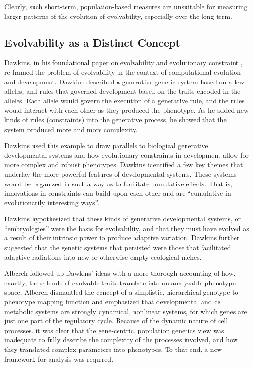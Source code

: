 \documentclass[PhD]{msu-thesis}
\begin{document}
Clearly, such short-term, population-based measures are unsuitable for measuring larger patterns of the evolution of evolvability, especially over the long term.

\subsection{Evolvability as a Distinct Concept}
Dawkins, in his foundational paper on evolvability and evolutionary constraint \cite{dawkins_13_2003}, re-framed the problem of evolvability in the context of computational evolution and development. Dawkins described a generative genetic system based on a few alleles, and rules that governed development based on the traits encoded in the alleles. Each allele would govern the execution of a generative rule, and the rules would interact with each other as they produced the phenotype. As he added new kinds of rules (constraints) into the generative process, he showed that the system produced more and more complexity.

Dawkins used this example to draw parallels to biological generative developmental systems and how evolutionary constraints in development allow for more complex and robust phenotypes. Dawkins identified a few key themes that underlay the more powerful features of developmental systems. These systems would be organized in such a way as to facilitate cumulative effects. That is, innovations in constraints can build upon each other and are “cumulative in evolutionarily interesting ways”\cite{dawkins_13_2003}.

Dawkins hypothesized that these kinds of generative developmental systems, or “embryologies” were the basis for evolvability, and that they must have evolved as a result of their intrinsic power to produce adaptive variation. Dawkins further suggested that the genetic systems that persisted were those that facilitated adaptive radiations into new or otherwise empty ecological niches.

Alberch followed up Dawkins’ ideas with a more thorough accounting of how, exactly, these kinds of evolvable traits translate into an analyzable phenotype space\cite{alberch_genes_1991}. Alberch dismantled the concept of a simplistic, hierarchical genotype-to-phenotype mapping function and emphasized that developmental and cell metabolic systems are strongly dynamical, nonlinear systems, for which genes are just one part of the regulatory cycle. Because of the dynamic nature of cell processes, it was clear that the gene-centric, population genetics view was inadequate to fully describe the complexity of the processes involved, and how they translated complex parameters into phenotypes. To that end, a new framework for analysis was required.
\end{document}
